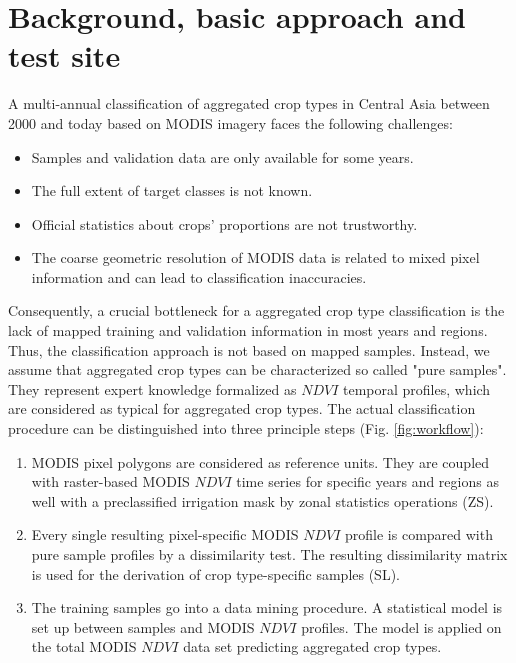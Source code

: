\section{Background, basic approach and test site}
A multi-annual classification of aggregated crop types in Central Asia between 2000 and today based on MODIS imagery faces the following challenges:

\begin{itemize}
\item Samples and validation data are only available for some years.
\item The full extent of target classes is not known.
\item Official statistics about crops' proportions are not trustworthy.
\item The coarse geometric resolution of MODIS data is related to mixed pixel information and can lead to classification inaccuracies.
\end{itemize}

Consequently, a crucial bottleneck for a aggregated crop type classification is the lack of mapped training and validation information in most years and regions. Thus, the classification approach is not based on mapped samples. Instead, we assume 
that aggregated crop types can be characterized so called "pure samples". They represent expert knowledge formalized as $NDVI$ temporal profiles, which are considered as typical for aggregated crop types. The actual classification procedure can be distinguished into three principle steps (Fig. \ref{fig:workflow}):

\begin{enumerate}
\item MODIS pixel polygons are considered as reference units. They are coupled with raster-based MODIS $NDVI$ time series for specific years and regions as well with a preclassified irrigation mask by zonal statistics operations (ZS). 
\item Every single resulting pixel-specific MODIS $NDVI$ profile is compared with pure sample profiles by a dissimilarity test. The resulting dissimilarity matrix is used for the derivation of crop type-specific samples (SL).
\item The training samples go into a data mining procedure. A statistical model is set up between samples and MODIS $NDVI$ profiles. The model is applied on the total MODIS $NDVI$ data set predicting aggregated crop types.
\end{enumerate}

